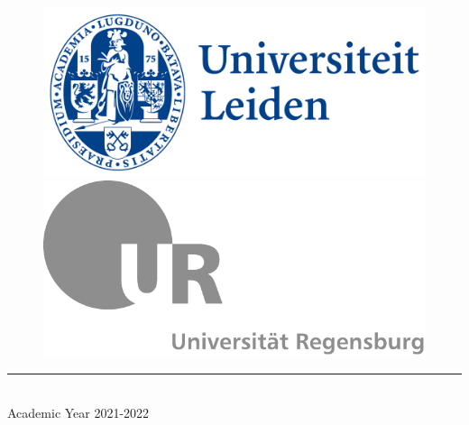 \begin{titlepage}
\begin{center}
    \begin{figure}[h!]
      \centering
      \begin{minipage}{0.5\linewidth}
        \centering
        \includegraphics[width=0.9\linewidth]{leiden_logo}
      \end{minipage}\hfill
      \begin{minipage}{0.5\linewidth}
        \centering
        \includegraphics[width=0.9\linewidth]{regensburg_logo}
      \end{minipage}
    \end{figure}
    \rule{\linewidth}{0.2mm}\\
    \small{Academic Year 2021-2022}
  \end{center}
\end{titlepage}

